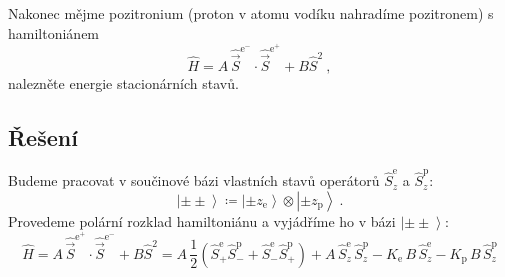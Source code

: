 \documentclass[10pt,a4paper]{article}
\newcommand{\const}[1]{\text{#1}}
\newcommand{\ket}[1]{\left| #1 \right>}
\newcommand{\vechat}[1]{\hat{\vec{#1}}}
\begin{document}
Nakonec mějme pozitronium (proton v atomu vodíku nahradíme pozitronem) s hamiltoniánem
\begin{equation*}
    \hat H
    = A \, \vechat S^{\const{e}^-} \!\! \cdot \vechat S^{\const{e}^+}
    + B \hat S^2
    \: ,
\end{equation*}
nalezněte energie stacionárních stavů.

\subsection{Řešení}
Budeme pracovat v součinové bázi vlastních stavů operátorů $\hat S_{\!z}^\const{e}$ a $\hat S_{\!z}^\const{p}$:
\begin{equation*}
    \ket{\pm\pm} \coloneqq \ket{\pm z_\const{e}} \otimes \ket{\pm z_\const{p}} \: .
\end{equation*}
Provedeme polární rozklad hamiltoniánu a vyjádříme ho v bázi $\ket{\pm\pm}$:
\begin{equation*}
    \hat H
    = A \, \vechat S^{\const{e}^+} \cdot \vechat S^{\const{e}^-} + B \hat S^2
    = A \, \frac{1}{2} \! \left( \hat S_{\!+}^\const{e} \hat S_{\!-}^\const{p} + \hat S_{\!-}^\const{e} \hat S_{\!+}^\const{p} \right) + A \,\hat S_{\!z}^\const{e} \, \hat S_{\!z}^\const{p} - K_\const{e} \, B \, \hat S_{\!z}^\const{e} - K_\const{p} \, B \, \hat S_{\!z}^\const{p}
\end{equation*}
\end{document}
